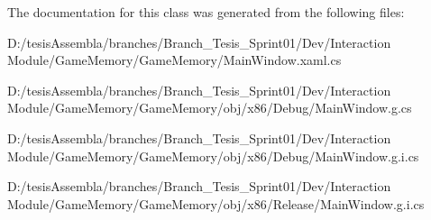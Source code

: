 The documentation for this class was generated from the following files\-:\begin{DoxyCompactItemize}
\item 
D\-:/tesis\-Assembla/branches/\-Branch\-\_\-\-Tesis\-\_\-\-Sprint01/\-Dev/\-Interaction Module/\-Game\-Memory/\-Game\-Memory/Main\-Window.\-xaml.\-cs\item 
D\-:/tesis\-Assembla/branches/\-Branch\-\_\-\-Tesis\-\_\-\-Sprint01/\-Dev/\-Interaction Module/\-Game\-Memory/\-Game\-Memory/obj/x86/\-Debug/Main\-Window.\-g.\-cs\item 
D\-:/tesis\-Assembla/branches/\-Branch\-\_\-\-Tesis\-\_\-\-Sprint01/\-Dev/\-Interaction Module/\-Game\-Memory/\-Game\-Memory/obj/x86/\-Debug/Main\-Window.\-g.\-i.\-cs\item 
D\-:/tesis\-Assembla/branches/\-Branch\-\_\-\-Tesis\-\_\-\-Sprint01/\-Dev/\-Interaction Module/\-Game\-Memory/\-Game\-Memory/obj/x86/\-Release/Main\-Window.\-g.\-i.\-cs\end{DoxyCompactItemize}

